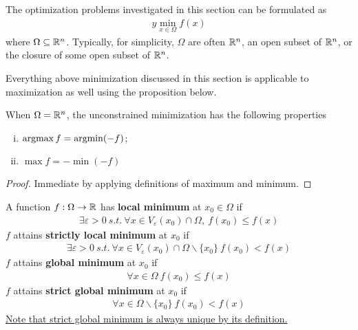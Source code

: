 \documentclass{article}
\begin{document}
    

    The optimization problems investigated in this section can be formulated as
    \begin{align} y
    	\min_{x \in \Omega} f(x)
    \end{align}
    where $\Omega \subseteq \mathbb{R}^n$. Typically, for simplicity, $\Omega$ are often $\mathbb{R}^n$, an open subset of $\mathbb{R}^n$, or the closure of some open subset of $\mathbb{R}^n$.
    \par Everything above minimization discussed in this section is applicable to maximization as well using the proposition below.

    \begin{proposition}
        When $\Omega = \mathbb{R}^n$, the unconstrained minimization has the following properties
        \begin{enumerate}[(i)]
            \item $\operatorname*{argmax} f = \operatorname*{argmin} (-f)$;
            \item $\max f = - \min (-f)$
        \end{enumerate}
    \end{proposition}
    
    \begin{proof}
    	Immediate by applying definitions of maximum and minimum.
    \end{proof}
   	
   	\begin{definition}
   		A function $f: \Omega \to \mathbb{R}$ has \textbf{local minimum} at $x_0 \in \Omega$ if
   		\begin{align}
   			\exists \varepsilon > 0\ s.t.\ \forall x \in V_\varepsilon(x_0) \cap \Omega,\  f(x_0) \leq f(x)
   		\end{align}
   		$f$ attains \textbf{strictly local minimum} at $x_0$ if
   		\begin{align}
   			\exists \varepsilon > 0\ s.t.\ \forall x \in V_\varepsilon(x_0) \cap \Omega \backslash \{x_0\}\ f(x_0) < f(x)
   		\end{align}
   		$f$ attains \textbf{global minimum} at $x_0$ if
   		\begin{align}
   			\forall x \in \Omega\ f(x_0) \leq f(x)
   		\end{align}
   		$f$ attains \textbf{strict global minimum} at $x_0$ if
   		\begin{align}
   			\forall x \in \Omega \backslash \{x_0\} \ f(x_0) < f(x)
   		\end{align}
   		\ul{Note that strict global minimum is always unique by its definition.}
   	\end{definition}
   	
\end{document}
